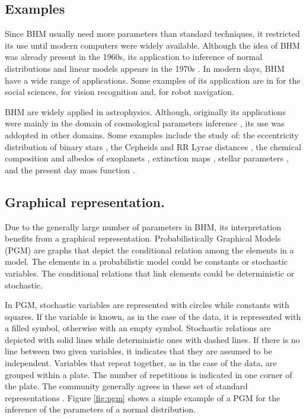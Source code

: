 \subsection{Examples}
Since BHM usually need more parameters than standard techniques, it restricted its use until modern computers were widely available.  
Although the idea of BHM was already present in the 1960s, its application to inference of normal distributions and linear models appears in the 1970s \cite[see][for an historical perspective of BHM]{Good1980}. In modern days, BHM have a wide range of applications. Some examples of its application are in \citet{Gelman2007} for the social sciences, \citet{Fei2005} for vision recognition and, \citet{Diard2008} for robot navigation.

BHM are widely applied in astrophysics. Although, originally its applications were mainly in the domain of cosmological parameters inference \cite[see for example the works of][]{Feeney2013,March2014,Anderes2015,Shariff2016,Alsing2017}, its use was addopted in other domains. Some examples include the study of: the eccentricity distribution of binary stars \citet{Hogg2010}, the Cepheids  \citep{Barnes2004} and RR Lyrae distances \citep{Jefferys2007}, the chemical composition \citep{Wolfgang2015} and albedos of exoplanets \citep{Demory2014}, extinction maps \citep{Sale2012}, stellar parameters \citep{Shkedy2007}, and the present day mass function \citep{Tapiador2017}.
\subsection{Graphical representation.}
Due to the generally large number of parameters in BHM, its interpretation benefits from a graphical representation. Probabilistically Graphical Models (PGM) are graphs that depict the conditional relation among the elements in a model. The elements in a probabilistic model could be constants or stochastic variables. The conditional relations that link elements could be deterministic or stochastic. 

In PGM, stochastic variables are represented with circles while constants with squares. If the variable is known, as in the case of the data, it is represented with a filled symbol, otherwise with an empty symbol. Stochastic relations are depicted with solid lines while deterministic ones with dashed lines. If there is no line between two given variables, it indicates that they are assumed to be independent. Variables that repeat together, as in the case of the data, are grouped within a plate. The number of repetitions is indicated in one corner of the plate. The community generally agrees in these set of standard representations \cite[for more details on PGM see for example the book of][]{Koller2009}. Figure \ref{fig:pgm} shows a simple example of a PGM for the inference of the parameters of a normal distribution.

